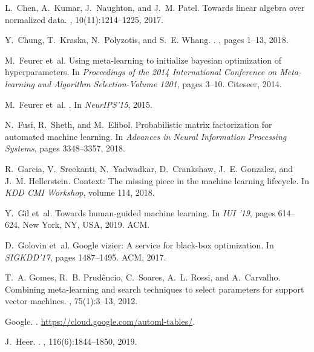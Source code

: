 \documentclass[11pt,dvipdfmx]{article}
\begin{document}
{\begin{thebibliography}{10}
L.~Chen, A.~Kumar, J.~Naughton, and J.~M. Patel.
\newblock Towards linear algebra over normalized data.
, 10(11):1214--1225, 2017.

Y.~Chung, T.~Kraska, N.~Polyzotis, and S.~E. Whang.
.
, pages 1--13, 2018.

M.~Feurer et~al.
\newblock Using meta-learning to initialize bayesian optimization of
  hyperparameters.
\newblock In {\em Proceedings of the 2014 International Conference on
  Meta-learning and Algorithm Selection-Volume 1201}, pages 3--10. Citeseer,
  2014.

M.~Feurer et~al.
.
\newblock In {\em NeurIPS'15}, 2015.

N.~Fusi, R.~Sheth, and M.~Elibol.
\newblock Probabilistic matrix factorization for automated machine learning.
\newblock In {\em Advances in Neural Information Processing Systems}, pages
  3348--3357, 2018.

R.~Garcia, V.~Sreekanti, N.~Yadwadkar, D.~Crankshaw, J.~E. Gonzalez, and J.~M.
  Hellerstein.
\newblock Context: The missing piece in the machine learning lifecycle.
\newblock In {\em KDD CMI Workshop}, volume 114, 2018.

Y.~Gil et~al.
\newblock Towards human-guided machine learning.
\newblock In {\em IUI '19}, pages 614--624, New York, NY, USA, 2019. ACM.

D.~Golovin et~al.
\newblock Google vizier: A service for black-box optimization.
\newblock In {\em SIGKDD'17}, pages 1487--1495. ACM, 2017.

T.~A. Gomes, R.~B. Prud{\^e}ncio, C.~Soares, A.~L. Rossi, and A.~Carvalho.
\newblock Combining meta-learning and search techniques to select parameters
  for support vector machines.
, 75(1):3--13, 2012.

Google.
.
\newblock \url{https://cloud.google.com/automl-tables/}.

J.~Heer.
.
,
  116(6):1844--1850, 2019.


\end{thebibliography}}
\end{document}
